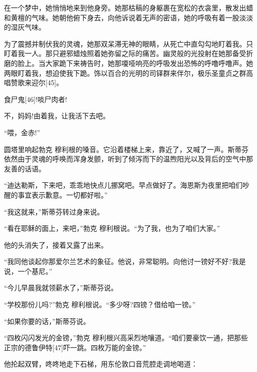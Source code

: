 \documentclass{article}
\begin{document}
在一个梦中，她悄悄地来到他身旁。她那枯稿的身躯裹在宽松的衣衾里，散发出蜡和黄檀的气味。她朝他俯下身去，向他诉说着无声的密语，她的呼吸有着一股淡淡的湿灰气味。



为了震撼并制伏我的灵魂，她那双呆滞无神的眼睛，从死亡中直勾勾地盯着我。只盯着我一人。那只避邪蜡烛照着她弥留之际的痛苦。幽灵般的光投射在她那备受折磨的脸上。当大家跪下来祷告时，她那嗄哑响亮的呼吸发出恐怖的呼噜呼噜声。她两眼盯着我，想迫使我下跪。饰以百合的光明的司铎群来伴尔，极乐圣童贞之群高唱赞歌来迎尔[45]。



食尸鬼[46]!啖尸肉者!



不，妈妈!由着我，让我活下去吧。



“喂，金赤!”



圆塔里响起勃克 \cdot 穆利根的嗓音。它沿着楼梯上来，靠近了，又喊了一声。斯蒂芬依然由于灵魂的呼唤而浑身发颤，听到了倾泻而下的温煦阳光以及背后的空气中那友善的话语。



“迪达勒斯，下来吧，乖乖地快点儿挪窝吧。早点做好了。海恩斯为夜里把咱们吵醒的事宜表示歉意。一切都好啦。”



“我这就来，”斯蒂芬转过身来说。



“看在耶稣的面上，来吧，”勃克 \cdot 穆利根说。“为了我，也为了咱们大家。”



他的头消失了，接着又露了出来。



“我同他谈起你那爱尔兰艺术的象征。他说，非常聪明。向他讨一镑好不好?我是说，一个基尼。”



“今儿早晨我就领薪水了，”斯蒂芬说。



“学校那份儿吗?”勃克 \cdot 穆利根说。“多少呀?四镑？借给咱一镑。”



“如果你要的话，”斯蒂芬说。



“四枚闪闪发光的金镑，”勃克 \cdot 穆利根兴高采烈地嚷道。“咱们要豪饮一通，把那些正宗的德鲁伊特[47]吓一跳。四枚万能的金镑。”



他抡起双臂，咚咚地走下石梯，用东伦敦口音荒腔走调地喝道：
\end{document}
